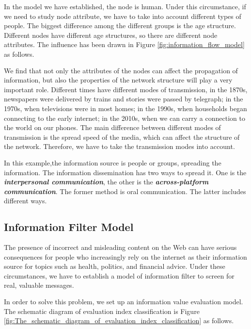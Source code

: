 \documentclass[a4paper,11pt]{article}
\begin{document}
\par In the model we have established, the node is human. Under this circumstance, if we need to study node attribute, we have to take into account different types of people. The biggest difference among the different groups is the age structure. Different nodes have different age structures, so there are different node attributes. The influence has been drawn in Figure \ref{fig:information_flow_model} as follows.



\par We find that not only the attributes of the nodes can affect the propagation of information, but also the properties of the network structure will play a very important role. Different times have different modes of transmission, in the 1870s, newspapers were delivered by trains and stories were passed by telegraph; in the 1970s, when televisions were in most homes; in the 1990s, when households began connecting to the early internet; in the 2010s, when we can carry a connection to the world on our phones. The main difference between different modes of transmission is the spread speed of the media, which can affect the structure of the network. Therefore, we have to take the transmission modes into account. 

\par In this example,the information source is people or groups, spreading the information. The information dissemination has two ways to spread it. One is the \textbf{\emph{interpersonal communication}}, the other is the \textbf{\emph{across-platform communication}}. The former method is oral communication. The latter includes different ways.



\subsection{Information Filter Model}
\par The presence of incorrect and misleading content on the Web can have serious consequences for people who increasingly rely on the internet as their information source for topics such as health, politics, and financial advice\cite{RD}. Under these circumstances, we have to establish a model of information filter to screen for real, valuable messages.
\par In order to solve this problem, we set up an information value evaluation model. The schematic diagram of evaluation index classification is Figure \ref{fig:The_schematic_diagram_of_evaluation_index_classification} as follows.
\end{document}
